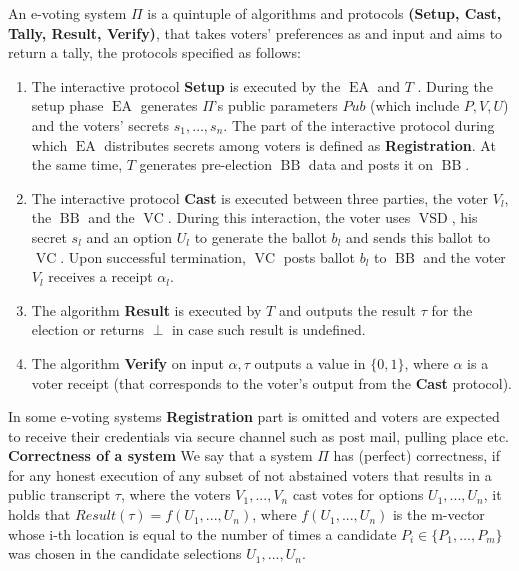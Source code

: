 \documentclass[12pt]{article}
\DeclareMathOperator{\vsd}{VSD}
\DeclareMathOperator{\ea}{EA}
\DeclareMathOperator{\bb}{BB}
\DeclareMathOperator{\voc}{VC}
\begin{document}
An e-voting system $\Pi$ is a quintuple of algorithms and protocols  \textbf{(Setup, Cast, Tally, Result, Verify)}, that takes  voters' preferences as and input and aims to return a tally, the protocols specified as follows:
\begin{enumerate}
\item The interactive protocol \textbf{Setup} is executed by the $\ea$ and $T$ . During the setup phase $\ea$ generates $\Pi$'s public parameters $Pub$ (which include $P, V, U$) and the voters' secrets $s_1, \dots , s_n$. The part of the interactive protocol during which $\ea$ distributes secrets among voters is defined as \textbf{Registration}. At the same time, $T$ generates pre-election $\bb$ data and posts it on $\bb$.
\item The interactive protocol \textbf{Cast} is executed between three parties, the voter $V_l$, the $\bb$ and the $\voc$. During this interaction, the voter uses $\vsd$, his secret $s_l$ and an option $U_l$ to generate the ballot $b_l$ and sends this ballot to $\voc$. Upon successful termination, $\voc$ posts ballot $b_l$ to $\bb$ and the voter $V_l$ receives a receipt $\alpha_l$.
\item The algorithm \textbf{Result} is executed by $T$ and outputs the result $\tau$ for the election or returns $\perp$ in case such result is undefined.
\item  The algorithm \textbf{Verify} on input $\alpha,\tau$ outputs a value in $\{0,1\}$, where  $\alpha$ is a voter receipt (that corresponds to the voter's output from the \textbf{Cast} protocol).
\end{enumerate}
In some e-voting systems \textbf{Registration} part is omitted and voters are expected to receive their credentials via secure channel such as post mail, pulling place etc.\\
\textbf{Correctness of a system}
We say that a system $\Pi$ has (perfect) correctness, if for any honest execution of any subset of not abstained voters that results in a public transcript $\tau$, where the voters $V_1, . . . , V_n$ cast votes for options $U_1, . . . , U_n$, it holds that $Result(\tau) = f(U_1,...,U_n)$, where $f(U_1,...,U_n)$ is the m-vector whose i-th location is equal to the number of times a candidate $P_i \in \{P_1,\dots, P_m\}$ was chosen in the candidate selections $U_1, . . . , U_n$.
\end{document}

